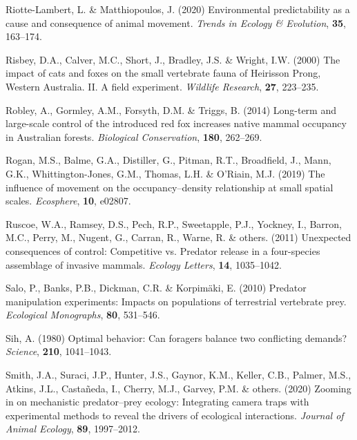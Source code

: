 \documentclass[]{elsarticle} %
\begin{document}
\leavevmode\hypertarget{ref-riotte-lambert2020environmental}{}%
Riotte-Lambert, L. \& Matthiopoulos, J. (2020) Environmental predictability as a cause and consequence of animal movement. \emph{Trends in Ecology \& Evolution}, \textbf{35}, 163--174.

\leavevmode\hypertarget{ref-risbey2000impacts}{}%
Risbey, D.A., Calver, M.C., Short, J., Bradley, J.S. \& Wright, I.W. (2000) The impact of cats and foxes on the small vertebrate fauna of Heirisson Prong, Western Australia. II. A field experiment. \emph{Wildlife Research}, \textbf{27}, 223--235.

\leavevmode\hypertarget{ref-robley2014long}{}%
Robley, A., Gormley, A.M., Forsyth, D.M. \& Triggs, B. (2014) Long-term and large-scale control of the introduced red fox increases native mammal occupancy in Australian forests. \emph{Biological Conservation}, \textbf{180}, 262--269.

\leavevmode\hypertarget{ref-rogan2019influence}{}%
Rogan, M.S., Balme, G.A., Distiller, G., Pitman, R.T., Broadfield, J., Mann, G.K., Whittington-Jones, G.M., Thomas, L.H. \& O'Riain, M.J. (2019) The influence of movement on the occupancy--density relationship at small spatial scales. \emph{Ecosphere}, \textbf{10}, e02807.

\leavevmode\hypertarget{ref-ruscoe2011unexpected}{}%
Ruscoe, W.A., Ramsey, D.S., Pech, R.P., Sweetapple, P.J., Yockney, I., Barron, M.C., Perry, M., Nugent, G., Carran, R., Warne, R. \& others. (2011) Unexpected consequences of control: Competitive vs. Predator release in a four-species assemblage of invasive mammals. \emph{Ecology Letters}, \textbf{14}, 1035--1042.

\leavevmode\hypertarget{ref-salo2010predator}{}%
Salo, P., Banks, P.B., Dickman, C.R. \& Korpimäki, E. (2010) Predator manipulation experiments: Impacts on populations of terrestrial vertebrate prey. \emph{Ecological Monographs}, \textbf{80}, 531--546.

\leavevmode\hypertarget{ref-sih1980optimal}{}%
Sih, A. (1980) Optimal behavior: Can foragers balance two conflicting demands? \emph{Science}, \textbf{210}, 1041--1043.

\leavevmode\hypertarget{ref-smith2020zooming}{}%
Smith, J.A., Suraci, J.P., Hunter, J.S., Gaynor, K.M., Keller, C.B., Palmer, M.S., Atkins, J.L., Castañeda, I., Cherry, M.J., Garvey, P.M. \& others. (2020) Zooming in on mechanistic predator--prey ecology: Integrating camera traps with experimental methods to reveal the drivers of ecological interactions. \emph{Journal of Animal Ecology}, \textbf{89}, 1997--2012.
\end{document}
